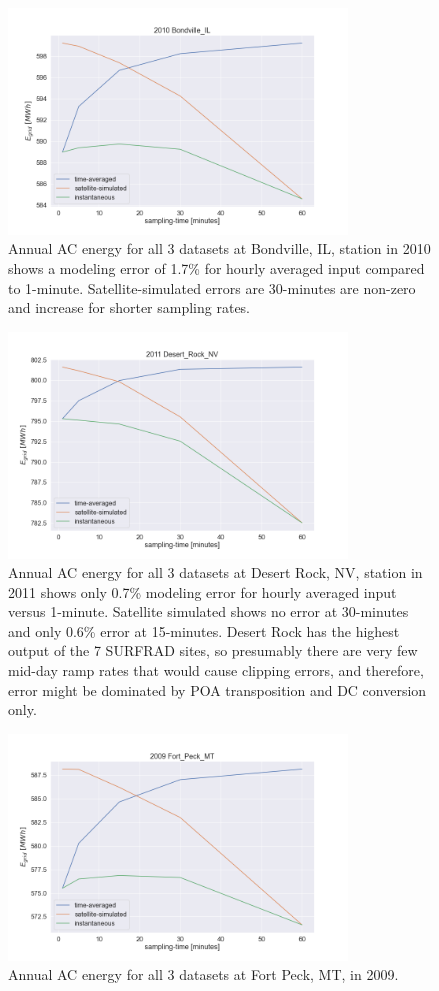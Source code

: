 \documentclass[conference]{IEEEtran}
\begin{document}
\begin{figure}[htbp]
\centerline{\includegraphics[width=9cm]{analysis/bon2010.png}}
\caption{Annual AC energy for all 3 datasets at Bondville, IL, station in 2010 shows a modeling error of 1.7\% for hourly averaged input compared to 1-minute. Satellite-simulated errors are 30-minutes are non-zero and increase for shorter sampling rates.}
\label{fig:bon2010}
\end{figure}

\begin{figure}[htbp]
\centerline{\includegraphics[width=9cm]{analysis/dra2011.png}}
\caption{Annual AC energy for all 3 datasets at Desert Rock, NV, station in 2011 shows only 0.7\% modeling error for hourly averaged input versus 1-minute. Satellite simulated shows no error at 30-minutes and only 0.6\% error at 15-minutes. Desert Rock has the highest output of the 7 SURFRAD sites, so presumably there are very few mid-day ramp rates that would cause clipping errors, and therefore, error might be dominated by POA transposition and DC conversion only.}
\label{fig:dra2011}
\end{figure}

\begin{figure}[htbp]
\centerline{\includegraphics[width=9cm]{analysis/fpk2009.png}}
\caption{Annual AC energy for all 3 datasets at Fort Peck, MT, in 2009.}
\label{fig:fpk2009}
\end{figure}
\end{document}

